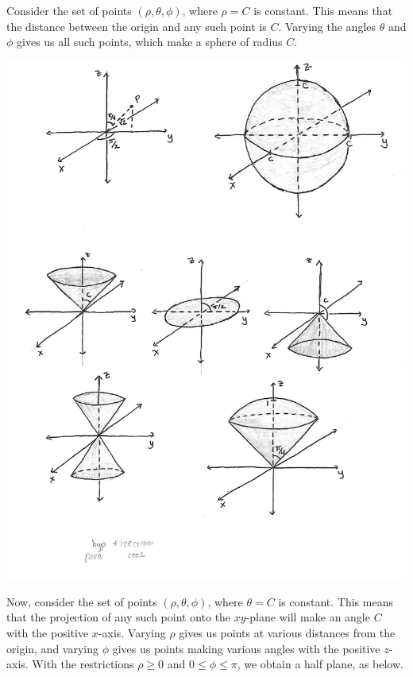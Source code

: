 \documentclass{ximera}
\begin{document}
Consider the set of points $(\rho, \theta, \phi)$, where $\rho = C$ is constant. This means that the distance between the origin and any such point is $C$. Varying the angles $\theta$ and $\phi$ gives us all such points, which make a sphere of radius $C$.

\begin{image}
\includegraphics{rho_constant}
\end{image}

Now, consider the set of points $(\rho, \theta, \phi)$, where $\theta = C$ is constant. This means that the projection of any such point onto the $xy$-plane will make an angle $C$ with the positive $x$-axis. Varying $\rho$ gives us points at various distances from the origin, and varying $\phi$ gives us points making various angles with the positive $z$-axis. With the restrictions $\rho\geq 0$ and $0\leq \phi\leq\pi$, we obtain a half plane, as below.
\end{document}
